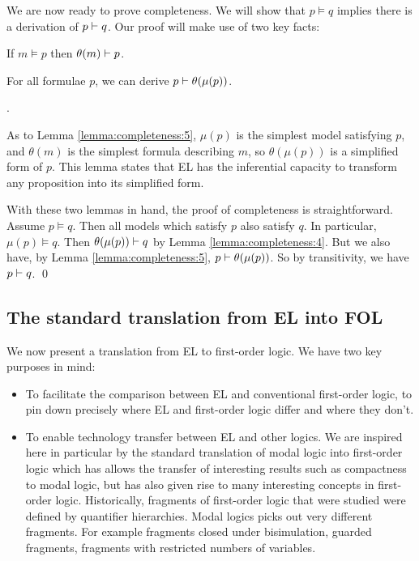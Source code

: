 \NI We are now ready to prove completeness.  We will show that $p
\models q$ implies there is a derivation of $p \vdash q$.  Our proof
will make use of two key facts:

\begin{lemma}\label{lemma:completeness:4}
If $m \models p$ then $\theta(m) \vdash p$.
\end{lemma}

\begin{lemma}\label{lemma:completeness:5}
For all formulae $p$, we can derive $p \vdash \theta(\mu(p))$.
\end{lemma}

.

As to Lemma \ref{lemma:completeness:5}, $\mu(p)$ is the simplest model
satisfying $p$, and $\theta(m)$ is the simplest formula describing
$m$, so $\theta(\mu(p))$ is a simplified form of $p$. This lemma
states that EL has the inferential capacity to transform any
proposition into its simplified form.

With these two lemmas in hand, the proof of completeness is
straightforward.  Assume $p \models q$.  Then all models which satisfy
$p$ also satisfy $q$.  In particular, $\mu(p) \models q$.  Then
$\theta(\mu(p)) \vdash q$ by Lemma \ref{lemma:completeness:4}.  But we
also have, by Lemma \ref{lemma:completeness:5}, $p \vdash
\theta(\mu(p)) $.  So by transitivity, we have $p \vdash q$.  \qed


\subsection{The standard translation from  EL into FOL}\label{standardTranslation}

We now present a translation from EL to first-order logic. We have two
key purposes in mind:

\begin{itemize}

\item To facilitate the comparison between EL and conventional
  first-order logic, to pin down precisely where EL and first-order
  logic differ and where they don't.

\item To enable technology transfer between EL and other logics. We
  are inspired here in particular by the standard translation of modal
  logic into first-order logic \cite{BlackburnP:modlog} which has
  allows the transfer of interesting results such as compactness to
  modal logic, but has also given rise to many interesting concepts in
  first-order logic.  Historically, fragments of first-order logic
  that were studied were defined by quantifier hierarchies. Modal
  logics picks out very different fragments. For example fragments
  closed under bisimulation, guarded fragments, fragments with
  restricted numbers of variables.

\end{itemize}

